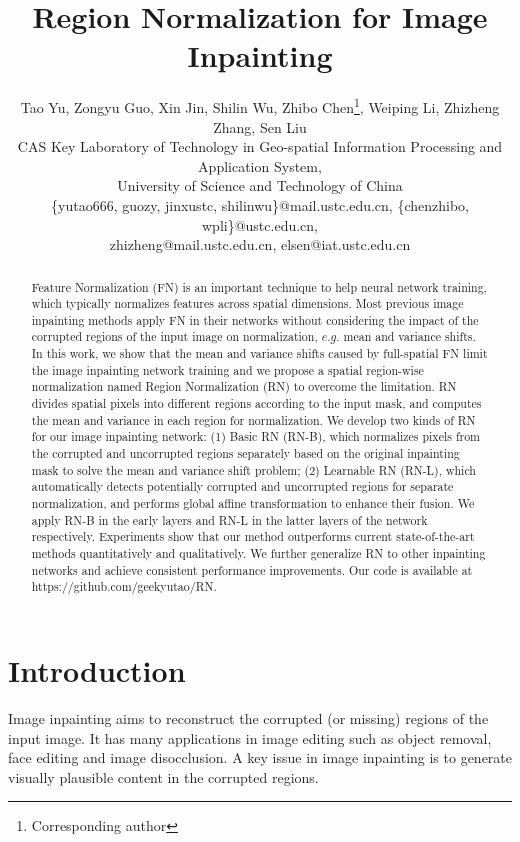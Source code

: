 \documentclass[letterpaper]{article} %
\title{Region Normalization for Image Inpainting}
\author{Tao Yu,
	Zongyu Guo,
	Xin Jin,
	Shilin Wu,
	Zhibo Chen\thanks{Corresponding author},
	Weiping Li,
	Zhizheng Zhang,
	Sen Liu\\ %
CAS Key Laboratory of Technology in Geo-spatial Information Processing and Application System,\\
University of Science and Technology of China\\
\{yutao666, guozy, jinxustc, shilinwu\}@mail.ustc.edu.cn, \{chenzhibo, wpli\}@ustc.edu.cn,\\ zhizheng@mail.ustc.edu.cn, elsen@iat.ustc.edu.cn %
}
\begin{document}
\maketitle

\begin{abstract}
Feature Normalization (FN) is an important technique to help neural network training, which typically normalizes features across spatial dimensions. Most previous image inpainting methods apply FN in their networks without considering the impact of the corrupted regions of the input image on normalization, $e.g.$ mean and variance shifts. In this work, we show that the mean and variance shifts caused by full-spatial FN limit the image inpainting network training and we propose a spatial region-wise normalization named Region Normalization (RN) to overcome the limitation. RN divides spatial pixels into different regions according to the input mask, and computes the mean and variance in each region for normalization. We develop two kinds of RN for our image inpainting network: (1) Basic RN (RN-B), which normalizes pixels from the corrupted and uncorrupted regions separately based on the original inpainting mask to solve the mean and variance shift problem; (2) Learnable RN (RN-L), which automatically detects potentially corrupted and uncorrupted regions for separate normalization, and performs global affine transformation to enhance their fusion. We apply RN-B in the early layers and RN-L in the latter layers of the network respectively. Experiments show that our method outperforms current state-of-the-art methods quantitatively and qualitatively. We further generalize RN to other inpainting networks and achieve consistent performance improvements. Our code is available at https://github.com/geekyutao/RN.
\end{abstract}



\section{Introduction}

Image inpainting aims to reconstruct the corrupted (or missing) regions of the input image. It has many applications in image editing such as object removal, face editing and image disocclusion. A key issue in image inpainting is to generate visually plausible content in the corrupted regions.
\end{document}
